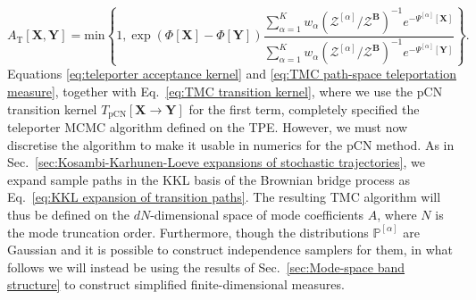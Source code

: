 \begin{equation} \label{eq:teleporter acceptance kernel}
	A_\text{T}[\mathbf{X},\mathbf{Y}] = \text{min} \left\{
		1,
		\exp ( \Phi[\mathbf{X}] - \Phi[\mathbf{Y}] )
		\frac{\sum_{\alpha=1}^K w_\alpha (\mathcal{Z}^{[\alpha]}/\mathcal{Z}^\mathbf{B})^{-1} e^{ - \Psi^{[\alpha]}[\mathbf{X}] } }{ \sum_{\alpha=1}^K w_\alpha (\mathcal{Z}^{[\alpha]}/\mathcal{Z}^\mathbf{B})^{-1} e^{ - \Psi^{[\alpha]}[\mathbf{Y}] } }
	\right\}.
\end{equation}
Equations \ref{eq:teleporter acceptance kernel} and \ref{eq:TMC path-space teleportation measure}, together with Eq.~\ref{eq:TMC transition kernel}, where we use the pCN transition kernel $T_\text{pCN}[\mathbf{X} \to \mathbf{Y}]$ for the first term, completely specified the teleporter MCMC algorithm defined on the TPE. However, we must now discretise the algorithm to make it usable in numerics for the pCN method. As in Sec.~\ref{sec:Kosambi-Karhunen-Loeve expansions of stochastic trajectories}, we expand sample paths in the KKL basis of the Brownian bridge process as Eq.~\ref{eq:KKL expansion of transition paths}. The resulting TMC algorithm will thus be defined on the $dN$-dimensional space of mode coefficients $A$, where $N$ is the mode truncation order. Furthermore, though the distributions $\mathbb{P}^{[\alpha]}$ are Gaussian and it is possible to construct independence samplers for them, in what follows we will instead be using the results of Sec.~\ref{sec:Mode-space band structure} to construct simplified finite-dimensional measures.

